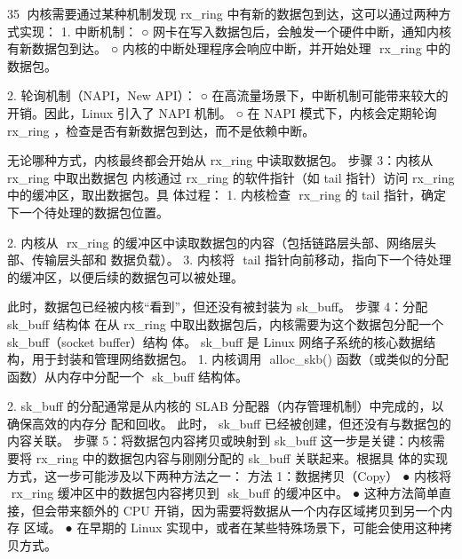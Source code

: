                                                            35
内核需要通过某种机制发现 ﻿rx_ring﻿ 中有新的数据包到达，这可以通过两种方式实现：
 1. 中断机制：
     ○ 网卡在写入数据包后，会触发一个硬件中断，通知内核有新数据包到达。
     ○ 内核的中断处理程序会响应中断，并开始处理 ﻿            rx_ring﻿ 中的数据包。

 2. 轮询机制（NAPI，New API）：
     ○ 在高流量场景下，中断机制可能带来较大的开销。因此，Linux 引入了 NAPI 机制。
     ○ 在 NAPI 模式下，内核会定期轮询 ﻿      rx_ring ，检查是否有新数据包到达，而不是依赖中断。

无论哪种方式，内核最终都会开始从 ﻿rx_ring﻿ 中读取数据包。
步骤 3：内核从 ﻿rx_ring﻿ 中取出数据包
内核通过 ﻿rx_ring﻿ 的软件指针（如 ﻿tail﻿ 指针）访问 ﻿rx_ring﻿ 中的缓冲区，取出数据包。具
体过程：
 1. 内核检查 ﻿  rx_ring﻿ 的 ﻿tail﻿ 指针，确定下一个待处理的数据包位置。

 2. 内核从 ﻿ rx_ring﻿ 的缓冲区中读取数据包的内容（包括链路层头部、网络层头部、传输层头部和
    数据负载）。
 3. 内核将 ﻿ tail﻿ 指针向前移动，指向下一个待处理的缓冲区，以便后续的数据包可以被处理。

此时，数据包已经被内核“看到”，但还没有被封装为 ﻿sk_buff﻿。
步骤 4：分配 ﻿sk_buff﻿ 结构体
在从 ﻿rx_ring﻿ 中取出数据包后，内核需要为这个数据包分配一个 ﻿sk_buff﻿（socket buffer）结构
体。 sk_buff﻿ 是 Linux 网络子系统的核心数据结构，用于封装和管理网络数据包。
 1. 内核调用 ﻿  alloc_skb()﻿ 函数（或类似的分配函数）从内存中分配一个 ﻿        sk_buff﻿ 结构体。

 2. sk_buff﻿ 的分配通常是从内核的 SLAB 分配器（内存管理机制）中完成的，以确保高效的内存分
    配和回收。
此时， sk_buff﻿ 已经被创建，但还没有与数据包的内容关联。
步骤 5：将数据包内容拷贝或映射到 ﻿sk_buff﻿
这一步是关键：内核需要将 ﻿rx_ring﻿ 中的数据包内容与刚刚分配的 ﻿sk_buff﻿ 关联起来。根据具
体的实现方式，这一步可能涉及以下两种方法之一：
方法 1：数据拷贝（Copy）
 ● 内核将 ﻿  rx_ring﻿ 缓冲区中的数据包内容拷贝到 ﻿       sk_buff﻿ 的缓冲区中。
 ● 这种方法简单直接，但会带来额外的 CPU 开销，因为需要将数据从一个内存区域拷贝到另一个内存
    区域。
 ● 在早期的 Linux 实现中，或者在某些特殊场景下，可能会使用这种拷贝方式。


